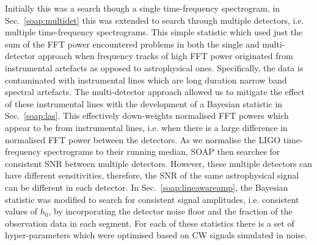 Initially this was a search though a single time-frequency spectrogram, in
Sec.~\ref{soap:multidet} this was extended to search through multiple
detectors, i.e. multiple time-frequency spectrograms.  This simple statistic
which used just the sum of the \gls{FFT} power encountered problems in both the
single and multi-detector approach when frequency tracks of high \gls{FFT}
power originated from instrumental artefacts as opposed to astrophysical ones.
Specifically, the data is contaminated with instrumental lines which are long duration narrow band spectral
artefacts.  The multi-detector approach allowed us to mitigate the effect of
these instrumental lines with the development of a Bayesian statistic in
Sec.~\ref{soap:las}.  This effectively down-weights normalised \gls{FFT} powers
which appear to be from instrumental lines, i.e. when there is a large
difference in normalised \gls{FFT} power between the detectors.  As we
normalise the \gls{LIGO} time-frequency spectrograms to their running median,
SOAP then searches for consistent \gls{SNR} between multiple detectors.
However, these multiple detectors can have different sensitivities, therefore,
the \gls{SNR} of the same astrophysical signal can be different in each
detector.  In Sec.~\ref{soap:lineawareamp}, the Bayesian statistic was modified
to search for consistent signal amplitudes, i.e. consistent values of $h_0$, by
incorporating the detector noise floor and the fraction of the observation data
in each segment.  For each of these statistics there is a set of hyper-parameters which were optimised based on \gls{CW} signals simulated
in noise. 

